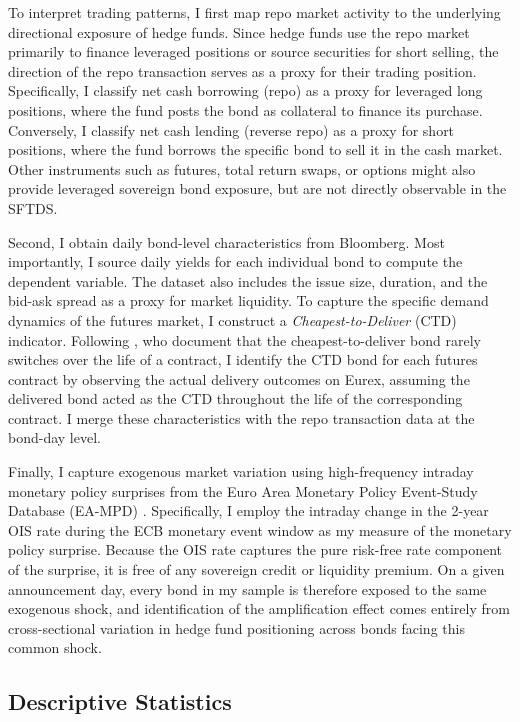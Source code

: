 \documentclass[english, 11pt, oneside]{article}
\begin{document}
To interpret trading patterns, I first map repo market activity to the underlying directional exposure of hedge funds. Since hedge funds use the repo market primarily to finance leveraged positions or source securities for short selling, the direction of the repo transaction serves as a proxy for their trading position. Specifically, I classify net cash borrowing (repo) as a proxy for leveraged long positions, where the fund posts the bond as collateral to finance its purchase. Conversely, I classify net cash lending (reverse repo) as a proxy for short positions, where the fund borrows the specific bond to sell it in the cash market. Other instruments such as futures, total return swaps, or options might also provide leveraged sovereign bond exposure, but are not directly observable in the SFTDS.

Second, I obtain daily bond-level characteristics from Bloomberg. Most importantly, I source daily yields for each individual bond to compute the dependent variable. The dataset also includes the issue size, duration, and the bid-ask spread as a proxy for market liquidity. To capture the specific demand dynamics of the futures market, I construct a \textit{Cheapest-to-Deliver} (CTD) indicator. Following \citet{pelizzon2025}, who document that the cheapest-to-deliver bond rarely switches over the life of a contract, I identify the CTD bond for each futures contract by observing the actual delivery outcomes on Eurex, assuming the delivered bond acted as the CTD throughout the life of the corresponding contract. I merge these characteristics with the repo transaction data at the bond-day level.

Finally, I capture exogenous market variation using high-frequency intraday monetary policy surprises from the Euro Area Monetary Policy Event-Study Database (EA-MPD) \citep{altavilla2019}. Specifically, I employ the intraday change in the 2-year OIS rate during the ECB monetary event window as my measure of the monetary policy surprise. Because the OIS rate captures the pure risk-free rate component of the surprise, it is free of any sovereign credit or liquidity premium. On a given announcement day, every bond in my sample is therefore exposed to the same exogenous shock, and identification of the amplification effect comes entirely from cross-sectional variation in hedge fund positioning across bonds facing this common shock.

\subsection{Descriptive Statistics}
\end{document}
